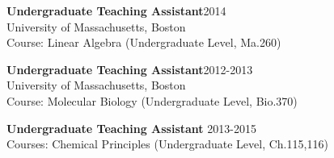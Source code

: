 \documentclass[letterpaper]{article}
\renewenvironment{itemize}{
  \begin{list}{}{
    \setlength{\leftmargin}{1.5em}
  }
}{
  \end{list}
}
\begin{document}
\begin{itemize}
\item \textbf{Undergraduate Teaching Assistant}\hfill 2014\\
      University of Massachusetts, Boston\\
      Course: Linear Algebra (Undergraduate Level, Ma.260)

\item \textbf{Undergraduate Teaching Assistant}\hfill 2012-2013\\
      University of Massachusetts, Boston\\
      Course: Molecular Biology (Undergraduate Level, Bio.370)



\item \textbf{Undergraduate Teaching Assistant} \hfill 2013-2015\\
      Courses: Chemical Principles (Undergraduate Level, Ch.115,116)



\end{itemize}
\end{document}
